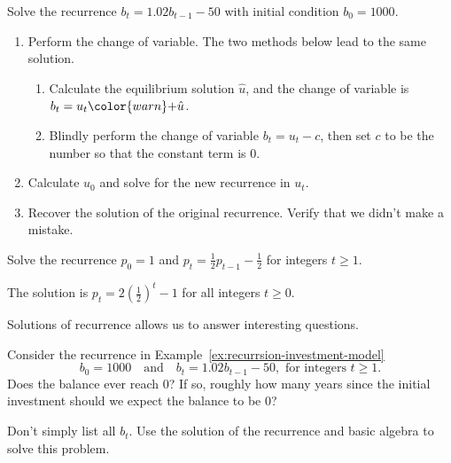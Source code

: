\documentclass[../main.tex]{subfiles}
\begin{document}
\begin{example}
  Solve the recurrence \(b_{t} = 1.02 b_{t-1} - 50\) with initial condition \(b_{0} = 1000\).

  \begin{enumerate}[wide, label={Step~(\arabic*).}]
    \item Perform the change of variable. The two methods below lead to the same solution.
      \begin{enumerate}[label={(\alph*)}]
        \item Calculate the equilibrium solution \(\hat{u}\), and the change of variable is \(b_{t} = u_{t} {\color{warn}+} \hat{u}\).
        \item Blindly perform the change of variable \(b_{t} = u_{t} - c\), then set \(c\) to be the number so that the constant term is \(0\).  
      \end{enumerate}

    \item Calculate \(u_{0}\) and solve for the new recurrence in \(u_{t}\). 

    \item Recover the solution of the original recurrence. Verify that we didn't make a mistake.
  \end{enumerate}
\end{example}
\clearpage

\begin{example}
  Solve the recurrence \(p_{0} = 1\) and \(p_{t} = \frac{1}{2} p_{t-1} - \frac{1}{2}\) for integers \(t \ge 1\).


  {\footnotesize The solution is \(p_{t} = 2 \left( \frac{1}{2} \right)^{t} - 1\) for all integers \(t \ge 0\).}
\end{example}

\clearpage

Solutions of recurrence allows us to answer interesting questions. 
\begin{example}
  Consider the recurrence in Example~\ref{ex:recurrsion-investment-model} 
  \[
    b_{0} = 1000 \quad\text{and}\quad b_{t} = 1.02 b_{t-1} - 50, \text{ for integers } t \ge 1. 
  \] 
  Does the balance ever reach \(0\)? If so, roughly how many years since the initial investment should we expect the balance to be \(0\)? 
  
  Don't simply list all \(b_{t}\). Use the solution of the recurrence and basic algebra to solve this problem.
\end{example}
\end{document}
